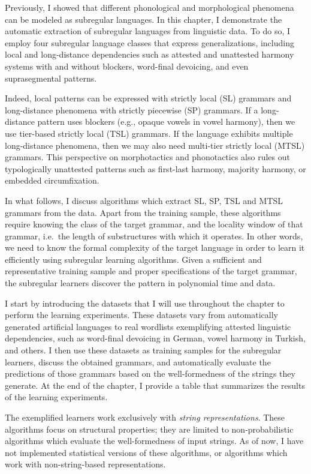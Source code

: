Previously, I showed that different phonological and morphological phenomena can be modeled as subregular languages.
In this chapter, I demonstrate the automatic extraction of subregular languages from linguistic data.
To do so, I employ four subregular language classes that express generalizations, including local and long-distance dependencies such as attested and unattested harmony systems with and without blockers, word-final devoicing, and even suprasegmental patterns.

Indeed, local patterns can be expressed with strictly local (SL) grammars and long-distance phenomena with strictly piecewise (SP) grammars.
If a long-distance pattern uses blockers (e.g., opaque vowels in vowel harmony), then we use tier-based strictly local (TSL) grammars.
If the language exhibits multiple long-distance phenomena, then we may also need  multi-tier strictly local (MTSL) grammars.
This perspective on morphotactics and phonotactics also rules out typologically unattested patterns such as first-last harmony, majority harmony, or embedded circumfixation.

In what follows, I discuss algorithms which extract SL, SP, TSL and MTSL grammars from the data.
Apart from the training sample, these algorithms require knowing the class of the target grammar, and the locality window of that grammar, i.e.\ the length of substructures with which it operates.
In other words, we need to know the formal complexity of the target language in order to learn it efficiently using subregular learning algorithms.
Given a sufficient and representative training sample and proper specifications of the target grammar, the subregular learners discover the pattern in polynomial time and data.

I start by introducing the datasets that I will use throughout the chapter to perform the learning experiments.
These datasets vary from automatically generated artificial languages to real wordlists exemplifying attested linguistic dependencies, such as word-final devoicing in German, vowel harmony in Turkish, and others.
I then use these datasets as training samples for the subregular learners, discuss the obtained grammars, and automatically evaluate the predictions of those grammars based on the well-formedness of the strings they generate.
At the end of the chapter, I provide a table that summarizes the results of the learning experiments.

The exemplified learners work exclusively with \emph{string representations}.
These algorithms focus on structural properties; they are limited to non-probabilistic algorithms which evaluate the well-formedness of input strings.
As of now, I have not implemented statistical versions of these algorithms, or algorithms which work with non-string-based representations.


